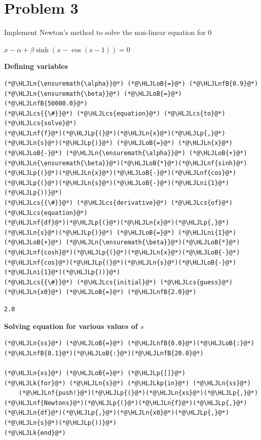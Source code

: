 \documentclass[12pt,a4paper]{article}
\newcommand{\HLJLk}[1]{\textcolor[RGB]{148,91,176}{\textbf{#1}}}
\newcommand{\HLJLkp}[1]{\textcolor[RGB]{148,91,176}{\textbf{#1}}}
\newcommand{\HLJLn}[1]{#1}
\newcommand{\HLJLnf}[1]{\textcolor[RGB]{66,102,213}{#1}}
\newcommand{\HLJLnfB}[1]{\textcolor[RGB]{59,151,46}{#1}}
\newcommand{\HLJLni}[1]{\textcolor[RGB]{59,151,46}{#1}}
\newcommand{\HLJLoB}[1]{\textcolor[RGB]{102,102,102}{\textbf{#1}}}
\newcommand{\HLJLp}[1]{#1}
\newcommand{\HLJLcs}[1]{\textcolor[RGB]{153,153,119}{\textit{#1}}}
\begin{document}
\section{Problem 3}
Implement Newton's method to solve the non-linear equation for 0

$x-\alpha+\beta\sinh\left( x - \cos(s-1) \right) = 0$

\textbf{Defining variables}


\begin{lstlisting}
(*@\HLJLn{\ensuremath{\alpha}}@*) (*@\HLJLoB{=}@*) (*@\HLJLnfB{0.9}@*)
(*@\HLJLn{\ensuremath{\beta}}@*) (*@\HLJLoB{=}@*) (*@\HLJLnfB{50000.0}@*)
(*@\HLJLcs{{\#}}@*) (*@\HLJLcs{equation}@*) (*@\HLJLcs{to}@*) (*@\HLJLcs{solve}@*)
(*@\HLJLnf{f}@*)(*@\HLJLp{(}@*)(*@\HLJLn{x}@*)(*@\HLJLp{,}@*)(*@\HLJLn{s}@*)(*@\HLJLp{)}@*) (*@\HLJLoB{=}@*) (*@\HLJLn{x}@*) (*@\HLJLoB{-}@*) (*@\HLJLn{\ensuremath{\alpha}}@*) (*@\HLJLoB{+}@*) (*@\HLJLn{\ensuremath{\beta}}@*)(*@\HLJLoB{*}@*)(*@\HLJLnf{sinh}@*)(*@\HLJLp{(}@*)(*@\HLJLn{x}@*)(*@\HLJLoB{-}@*)(*@\HLJLnf{cos}@*)(*@\HLJLp{(}@*)(*@\HLJLn{s}@*)(*@\HLJLoB{-}@*)(*@\HLJLni{1}@*)(*@\HLJLp{))}@*)
(*@\HLJLcs{{\#}}@*) (*@\HLJLcs{derivative}@*) (*@\HLJLcs{of}@*) (*@\HLJLcs{equation}@*)
(*@\HLJLnf{df}@*)(*@\HLJLp{(}@*)(*@\HLJLn{x}@*)(*@\HLJLp{,}@*)(*@\HLJLn{s}@*)(*@\HLJLp{)}@*) (*@\HLJLoB{=}@*) (*@\HLJLni{1}@*) (*@\HLJLoB{+}@*) (*@\HLJLn{\ensuremath{\beta}}@*)(*@\HLJLoB{*}@*)(*@\HLJLnf{cosh}@*)(*@\HLJLp{(}@*)(*@\HLJLn{x}@*)(*@\HLJLoB{-}@*)(*@\HLJLnf{cos}@*)(*@\HLJLp{(}@*)(*@\HLJLn{s}@*)(*@\HLJLoB{-}@*)(*@\HLJLni{1}@*)(*@\HLJLp{))}@*)
(*@\HLJLcs{{\#}}@*) (*@\HLJLcs{initial}@*) (*@\HLJLcs{guess}@*)
(*@\HLJLn{x0}@*) (*@\HLJLoB{=}@*) (*@\HLJLnfB{2.0}@*)
\end{lstlisting}

\begin{lstlisting}
2.0
\end{lstlisting}


\textbf{Solving equation for various values of $s$}


\begin{lstlisting}
(*@\HLJLn{ss}@*) (*@\HLJLoB{=}@*) (*@\HLJLnfB{0.0}@*)(*@\HLJLoB{:}@*)(*@\HLJLnfB{0.1}@*)(*@\HLJLoB{:}@*)(*@\HLJLnfB{20.0}@*)

(*@\HLJLn{xs}@*) (*@\HLJLoB{=}@*) (*@\HLJLp{[]}@*)
(*@\HLJLk{for}@*) (*@\HLJLn{s}@*) (*@\HLJLkp{in}@*) (*@\HLJLn{ss}@*)
    (*@\HLJLnf{push!}@*)(*@\HLJLp{(}@*)(*@\HLJLn{xs}@*)(*@\HLJLp{,}@*)(*@\HLJLnf{Newtons}@*)(*@\HLJLp{(}@*)(*@\HLJLn{f}@*)(*@\HLJLp{,}@*)(*@\HLJLn{df}@*)(*@\HLJLp{,}@*)(*@\HLJLn{x0}@*)(*@\HLJLp{,}@*)(*@\HLJLn{s}@*)(*@\HLJLp{))}@*)
(*@\HLJLk{end}@*)
\end{lstlisting}
\end{document}
